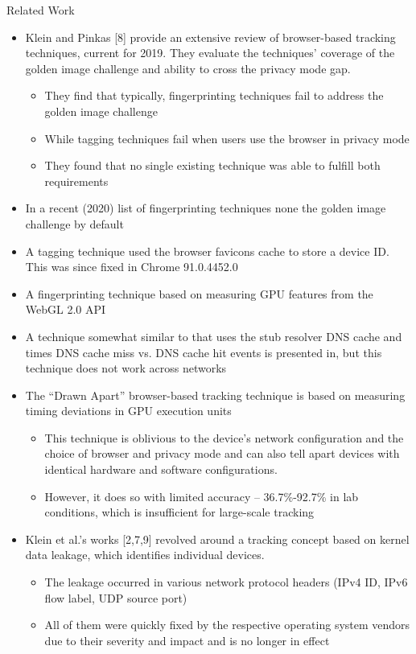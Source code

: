 \documentclass[a4paper]{article}
\begin{document}
\begin{frame}[fragile]{Related Work}{}
	\begin{itemize}
		\item Klein and Pinkas [8] provide an extensive review of browser-based tracking techniques, current for 2019. They evaluate the techniques’ coverage of the golden image challenge and ability to cross the privacy mode gap.
		\begin{itemize}
			\item They find that typically, fingerprinting techniques fail to address the golden image challenge
			\item While tagging techniques fail when users use the browser in privacy mode
			\item They found that no single existing technique was able to fulfill both requirements
		\end{itemize}
		\item In a recent (2020) list of fingerprinting techniques none the golden image challenge by default
		\item A tagging technique used the browser favicons cache to store a device ID. This was since fixed in Chrome 91.0.4452.0
		\item A fingerprinting technique based on measuring GPU features from the WebGL 2.0 API
		\item A technique somewhat similar to that uses the stub resolver DNS cache and times DNS cache miss vs. DNS cache hit events is presented in, but this technique does not work across networks
		\item The \enquote{Drawn Apart} browser-based tracking technique is based on measuring timing deviations in GPU execution units
		\begin{itemize}
			\item This technique is oblivious to the device’s network configuration and the choice of browser and privacy mode and can also tell apart devices with identical hardware and software configurations.
			\item However, it does so with limited accuracy – 36.7\%-92.7\% in lab conditions, which is insufficient for large-scale tracking
		\end{itemize}
		\item Klein et al.’s works [2,7,9] revolved around a tracking concept based on kernel data leakage, which identifies individual devices.
		\begin{itemize}
			\item The leakage occurred in various network protocol headers (IPv4 ID, IPv6 flow label, UDP source port)
			\item All of them were quickly fixed by the respective operating system vendors due to their severity and impact and is no longer in effect
		\end{itemize}
	\end{itemize}
\end{frame}
\end{document}
